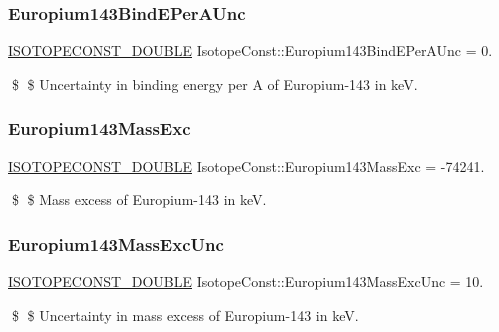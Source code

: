\subsubsection{\texorpdfstring{Europium143\+Bind\+E\+Per\+A\+Unc}{Europium143BindEPerAUnc}}
{\footnotesize\ttfamily \mbox{\hyperlink{group___isotope_const-_macros_ga8f45a7272ce02c0b4c65c44636ed719a}{I\+S\+O\+T\+O\+P\+E\+C\+O\+N\+S\+T\+\_\+\+D\+O\+U\+B\+LE}} Isotope\+Const\+::\+Europium143\+Bind\+E\+Per\+A\+Unc = 0.}

\$ \$ Uncertainty in binding energy per A of Europium-\/143 in keV. \mbox{\label{group___isotope_const-_europium-_eu143_gab78e6a1bbc6284b59a0712eb2d875416}} 
\subsubsection{\texorpdfstring{Europium143\+Mass\+Exc}{Europium143MassExc}}
{\footnotesize\ttfamily \mbox{\hyperlink{group___isotope_const-_macros_ga8f45a7272ce02c0b4c65c44636ed719a}{I\+S\+O\+T\+O\+P\+E\+C\+O\+N\+S\+T\+\_\+\+D\+O\+U\+B\+LE}} Isotope\+Const\+::\+Europium143\+Mass\+Exc = -\/74241.}

\$ \$ Mass excess of Europium-\/143 in keV. \mbox{\label{group___isotope_const-_europium-_eu143_ga28f7207591b2c3556496b28b0eff4d76}} 
\subsubsection{\texorpdfstring{Europium143\+Mass\+Exc\+Unc}{Europium143MassExcUnc}}
{\footnotesize\ttfamily \mbox{\hyperlink{group___isotope_const-_macros_ga8f45a7272ce02c0b4c65c44636ed719a}{I\+S\+O\+T\+O\+P\+E\+C\+O\+N\+S\+T\+\_\+\+D\+O\+U\+B\+LE}} Isotope\+Const\+::\+Europium143\+Mass\+Exc\+Unc = 10.}

\$ \$ Uncertainty in mass excess of Europium-\/143 in keV. \mbox{\label{group___isotope_const-_europium-_eu143_gab3466c3eb1cbc30e9ebc244e958c9c0e}} 
